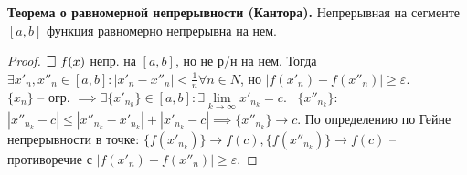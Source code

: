 \bigbreak
\textbf{Теорема о равномерной непрерывности (Кантора).} Непрерывная на сегменте $[a,b]$ функция равномерно непрерывна на нем. 

\begin{proof}
$\mathLet ~ f(x)$ непр. на $[a,b]$, но не р/н на нем. Тогда $\exists x'_n, x''_n \in [a,b]: \left|x'_n-x''_n\right| < \frac{1}{n} \forall n \in N$, но $\left|f(x'_n)-f(x''_n)\right| \geq \varepsilon$. \\
$\{x_n\}$ -- огр. $\implies \exists \{x'_{n_k}\}\in [a,b]: \exists \lim\limits_{k \to \infty} x'_{n_k} = c$. 
\faEye \ $\{x''_{n_k}\}$: $\left|x''_{n_k} - c\right| \leq \left|x''_{n_k} - x'_{n_k}\right| + \left|x'_{n_k} - c\right| \implies \{x''_{n_k}\} \to c$. По определению по Гейне непрерывности в точке: $\{f(x'_{n_k})\} \to f(c), \{f(x''_{n_k})\} \to f(c)$ -- противоречие с $\left|f(x'_n)-f(x''_n)\right| \geq \varepsilon$.
\end{proof}
